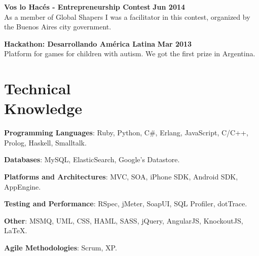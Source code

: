\documentclass[margin,line]{resume}
\begin{document}
\begin{resume}
\textbf{Vos lo Hac\'es - Entrepreneurship Contest} \hfill \textbf{Jun 2014} \vspace{2mm} \\
As a member of Global Shapers I was a facilitator in this contest, organized by the Buenos Aires city government.
 
\textbf{Hackathon: Desarrollando Am\'erica Latina} \hfill \textbf{Mar 2013} \vspace{2mm} \\
Platform for games for children with autism. We got the first prize in Argentina.

\newpage


\section{\mysidestyle Technical\\Knowledge}

\textbf{Programming Languages}: Ruby, Python, C\#, Erlang, JavaScript, C/C++, Prolog, Haskell, Smalltalk. \vspace{-2mm}
    
\textbf{Databases}: MySQL, ElasticSearch, Google's Datastore. \vspace{-2mm}

\textbf{Platforms and Architectures}: MVC, SOA, iPhone SDK, Android SDK, AppEngine. \vspace{-2mm}

\textbf{Testing and Performance}: RSpec, jMeter, SoapUI, SQL Profiler, dotTrace.\vspace{-2mm}
   
\textbf{Other}: MSMQ, UML, CSS, HAML, SASS, jQuery, AngularJS, KnockoutJS, \LaTeX . \vspace{-2mm}
    
\textbf{Agile Methodologies}: Scrum, XP. \vspace{-2mm}
    

\end{resume}
\end{document}

